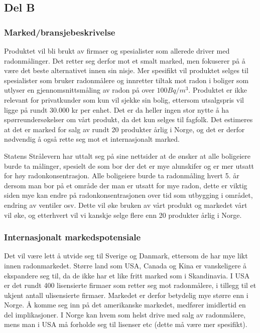 \subsection{Del B}

\subsubsection{Marked/bransjebeskrivelse}

Produktet vil bli brukt av firmaer og spesialister som allerede driver med radonmålinger. Det retter seg derfor mot et smalt marked, men fokuserer på å være det beste alternativet innen sin nisje. Mer spesifikt vil produktet selges til spesialister som bruker radonmålere og innretter tiltak mot radon i boliger som utlyser en gjennomsnittsmåling av radon på over $100 Bq/m^3$. Produktet er ikke relevant for privatkunder som kun vil sjekke sin bolig, ettersom utsalgspris vil ligge på rundt 30.000 kr per enhet. Det er da heller ingen stor nytte å ha spørreundersøkelser om vårt produkt, da det kun selges til fagfolk. Det estimeres at det er marked for salg av rundt 20 produkter årlig i Norge, og det er derfor nødvendig å også rette seg mot et internasjonalt marked.

Statens Strålevern har uttalt seg på sine nettsider at de ønsker at alle boligeiere burde ta målinger, spesielt de som bor der det er mye alunskifer og er mer utsatt for høy radonkonsentrasjon. Alle boligeiere burde ta radonmåling hvert 5. år dersom man bor på et område der man er utsatt for mye radon, dette er viktig siden mye kan endre på  radonkonsentrasjonen over tid som utbygging i området, endring av ventiler osv. Dette vil øke bruken av vårt produkt og markedet vårt vil øke, og etterhvert vil vi kanskje selge flere enn 20 produkter årlig i Norge. 

\subsubsection{Internasjonalt markedspotensiale}
Det vil være lett å utvide seg til Sverige og Danmark, ettersom de har mye likt innen radonmarkedet. Større land som USA, Canada og Kina er vanskeligere å ekspandere seg til, da de ikke har et like fritt marked som i Skandinavia. I USA er det rundt 400 lisensierte firmaer som retter seg mot radonmålere, i tillegg til et ukjent antall ulisensierte firmaer. Markedet er derfor betydelig mye større enn i Norge. Å komme seg inn på det amerikanske markedet, medfører imidlertid en del implikasjoner. I Norge kan hvem som helst drive med salg av radonmålere, mens man i USA må forholde seg til lisenser etc (dette må være mer spesifikt).

